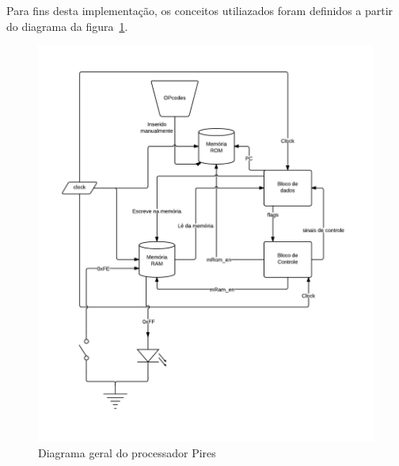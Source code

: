 \documentclass[../main.tex]{subfiles}
\begin{document}
	Para fins desta implementação, os conceitos utiliazados foram
	definidos a partir do diagrama da figura~\ref{fig:processador_pires}.
	
	\begin{figure}[H]
		\centering
		\includegraphics[height=0.6\textheight]{img/processador_pires}
		\caption{Diagrama geral do processador Pires}
		\label{fig:processador_pires}
	\end{figure}
	
\end{document}
